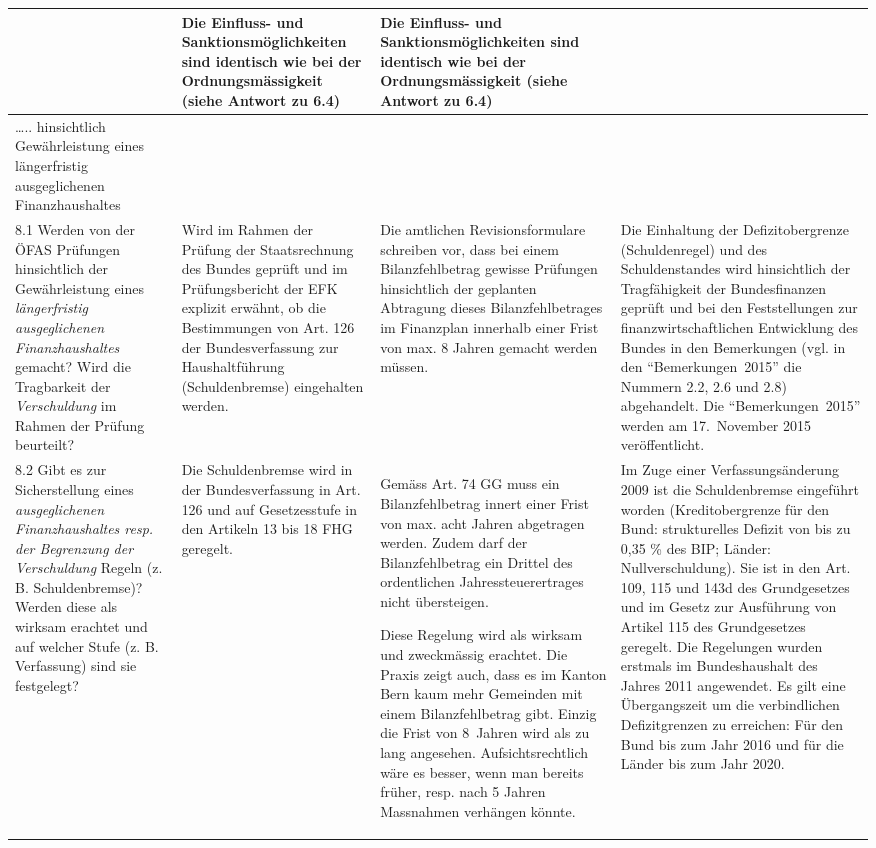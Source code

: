 \documentclass[10pt]{article}
\begin{document}
\begin{landscape}
\begin{center}
\begin{longtable}{|p{4cm}|p{5cm}|p{7.5cm}|p{7.5cm}|}
 & Die Einfluss- und Sanktions­möglichkeiten sind identisch wie bei der Ordnungsmässigkeit (siehe Antwort zu 6.4) & Die Einfluss- und Sanktionsmöglichkeiten sind identisch wie bei der Ordnungsmässigkeit (siehe Antwort zu 6.4) \\
\hline
….. hinsichtlich Gewährleistung eines längerfristig ausgeglichenen Finanzhaushaltes &  &  &  \\
\hline
8.1 Werden von der ÖFAS Prüfungen hinsichtlich der Gewährleistung eines \textit{längerfristig ausgeglichenen Finanzhaushaltes} gemacht? Wird die Tragbarkeit der \textit{Verschuldung} im Rahmen der Prüfung beurteilt? & Wird im Rahmen der Prüfung der Staatsrechnung des Bundes geprüft und im Prüfungsbericht der EFK explizit erwähnt, ob die Bestimmungen von Art. 126 der Bundesverfassung zur Haushaltführung (Schuldenbremse) eingehalten werden. & Die amtlichen Revisionsformulare schreiben vor, dass bei einem Bilanzfehlbetrag gewisse Prüfungen hinsichtlich der geplanten Abtragung dieses Bilanzfehlbetrages im Finanzplan innerhalb einer Frist von max. 8 Jahren gemacht werden müssen. & Die Einhaltung der Defizitobergrenze (Schuldenregel) und des Schuldenstandes wird hinsichtlich der Tragfähigkeit der Bundesfinanzen geprüft und bei den Feststellungen zur finanzwirtschaftlichen Entwicklung des Bundes in den Bemerkungen (vgl. in den “{}Bemerkungen~2015”{} die Nummern 2.2, 2.6 und 2.8) abgehandelt. Die “{}Bemerkungen~2015”{} werden am 17.~November 2015 veröffentlicht. \\
\hline
8.2 Gibt es zur Sicherstellung eines \textit{ausgeglichenen Finanzhaushaltes resp. der Begrenzung der Verschuldung} Regeln (z. B. Schuldenbremse)? Werden diese als wirksam erachtet und auf welcher Stufe (z. B. Verfassung) sind sie festgelegt? & Die Schuldenbremse wird in der Bundesverfassung in Art. 126 und auf Gesetzesstufe in den Artikeln 13 bis 18 FHG geregelt. & Gemäss Art. 74 GG muss ein Bilanzfehlbetrag innert einer Frist von max. acht Jahren abgetragen werden. Zudem darf der Bilanzfehlbetrag ein Drittel des ordentlichen Jahressteuerertrages nicht übersteigen.

Diese Regelung wird als wirksam und zweckmässig erachtet. Die Praxis zeigt auch, dass es im Kanton Bern kaum mehr Gemeinden mit einem Bilanzfehl­betrag gibt. Einzig die Frist von 8~Jahren wird als zu lang angesehen. Aufsichtsrechtlich wäre es besser, wenn man bereits früher, resp. nach 5 Jahren Massnahmen verhängen könnte.

 & Im Zuge einer Verfassungs­änderung 2009 ist die Schulden­bremse eingeführt worden (Kredit­obergrenze für den Bund: struktu­relles Defizit von bis zu 0,35 \% des BIP; Länder: Nullverschuldung). Sie ist in den Art. 109, 115 und 143d des Grundgesetzes und im Gesetz zur Ausführung von Artikel 115 des Grundgesetzes geregelt. Die Regelungen wurden erstmals im Bundeshaushalt des Jahres 2011 angewendet. Es gilt eine Übergangszeit um die verbind­lichen Defizitgrenzen zu erreichen: Für den Bund bis zum Jahr 2016 und für die Länder bis zum Jahr 2020.


\end{longtable}
\end{center}
\end{landscape}
\end{document}
